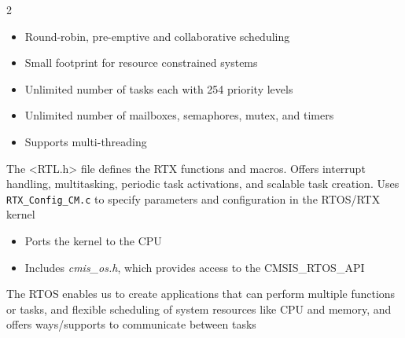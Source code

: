 \documentclass[a4paper,11pt]{article}
\newcommand{\code}[1]{\texttt{#1}}
\begin{document}
\Needspace{76pt}
\begin{multicols}{2}
\begin{itemize}
\item \begin{minipage}[t]{\linewidth}Round-robin, pre-emptive and collaborative scheduling\end{minipage}
\item \begin{minipage}[t]{\linewidth}Small footprint for resource constrained systems\end{minipage}
\item \begin{minipage}[t]{\linewidth}Unlimited number of tasks each with 254 priority levels\end{minipage}
\item \begin{minipage}[t]{\linewidth}Unlimited number of mailboxes, semaphores, mutex, and timers\end{minipage}
\item \begin{minipage}[t]{\linewidth}Supports multi-threading\end{minipage}
\end{itemize}
\end{multicols}



\Needspace{140pt}



The \textless{}RTL.h\textgreater{} file defines the RTX functions and macros. Offers interrupt handling, multitasking, periodic task activations, and scalable task creation. Uses \code{RTX\_Config\_CM.c} to specify parameters and configuration in the RTOS/RTX kernel\par

\Needspace{40pt}
\begin{itemize}
\item Ports the kernel to the CPU
\item Includes \emph{cmis\_os.h}, which provides access to the CMSIS\_RTOS\_API
\end{itemize}






The RTOS enables us to create applications that can perform multiple functions or tasks, and flexible scheduling of system resources like CPU and memory, and offers ways/supports to communicate between tasks\par
\end{document}
